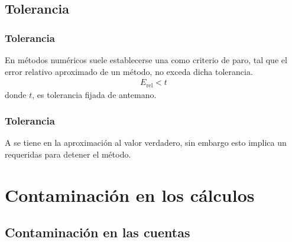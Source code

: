 \documentclass[12pt]{beamer}
\begin{document}

\subsection{Tolerancia}

\begin{frame}
\frametitle{Tolerancia}
En métodos numéricos suele establecerse una  como criterio de paro, \pause tal
que el error relativo aproximado de un método, no exceda dicha tolerancia.
\begin{align*}
E_{\text{rel}} < t
\end{align*}
donde $t$, es tolerancia fijada de antemano.
\end{frame}
\begin{frame}
\frametitle{Tolerancia}
A  se tiene  en la aproximación al valor verdadero, \pause sin embargo esto implica un  requeridas para detener el método.
\end{frame}

\section{Contaminación en los cálculos}
\subsection{Contaminación en las cuentas}
\end{document}
